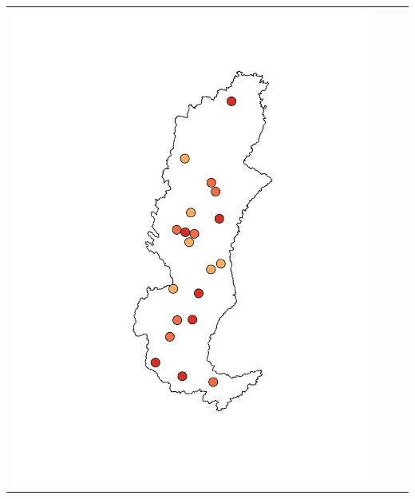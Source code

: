 
\begin{landscape}
	\begin{tabular}{c c c l} %
		\includegraphics[trim= 4cm 2cm 1cm 2cm, clip, scale = 0.35]{./img/pbias_harg} &

\end{tabular}
\end{landscape}
